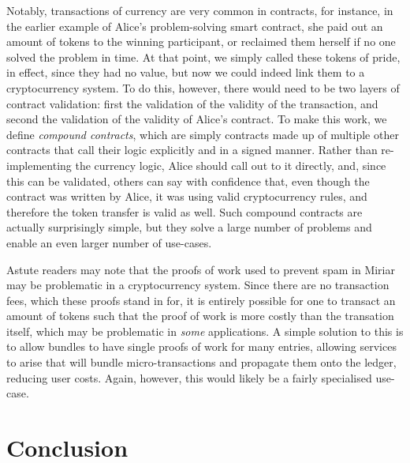 \documentclass{extreport}
\begin{document}
Notably, transactions of currency are very common in contracts, for instance, in the earlier example of Alice's problem-solving smart contract, she paid out an amount of tokens to the winning participant, or reclaimed them herself if no one solved the problem in time. At that point, we simply called these tokens of pride, in effect, since they had no value, but now we could indeed link them to a cryptocurrency system. To do this, however, there would need to be two layers of contract validation: first the validation of the validity of the transaction, and second the validation of the validity of Alice's contract. To make this work, we define \emph{compound contracts}, which are simply contracts made up of multiple other contracts that call their logic explicitly and in a signed manner. Rather than re-implementing the currency logic, Alice should call out to it directly, and, since this can be validated, others can say with confidence that, even though the contract was written by Alice, it was using valid cryptocurrency rules, and therefore the token transfer is valid as well. Such compound contracts are actually surprisingly simple, but they solve a large number of problems and enable an even larger number of use-cases.

Astute readers may note that the proofs of work used to prevent spam in Miriar may be problematic in a cryptocurrency system. Since there are no transaction fees, which these proofs stand in for, it is entirely possible for one to transact an amount of tokens such that the proof of work is more costly than the transation itself, which may be problematic in \emph{some} applications. A simple solution to this is to allow bundles to have single proofs of work for many entries, allowing services to arise that will bundle micro-transactions and propagate them onto the ledger, reducing user costs. Again, however, this would likely be a fairly specialised use-case.

\part{Conclusion}
\label{sec:orgce41842}
\end{document}
